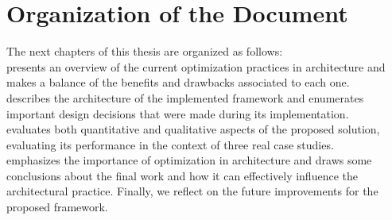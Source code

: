 \section{Organization of the Document}
The next chapters of this thesis are organized as follows: \\ 
\textbf{} presents an overview of the current optimization practices in architecture and makes a balance of the benefits and drawbacks associated to each one.  \\
\textbf{} describes the architecture of the implemented framework and enumerates important design decisions that were made during its implementation. \\
\textbf{} evaluates both quantitative and qualitative aspects of the proposed solution, evaluating its performance in the context of three real case studies. \\
\textbf{} emphasizes the importance of optimization in architecture and draws some conclusions about the final work and how it can effectively influence the architectural practice. Finally, we reflect on the future improvements for the proposed framework. \\
